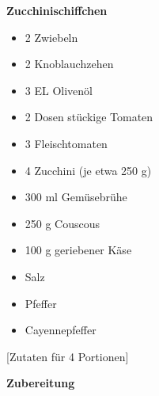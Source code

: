 

\parindent0pt	

\pagestyle{empty}


\textbf{{\LARGE Zucchinischiffchen}}%

\hrulefill
\vspace*{\fill}
\begin{multicols}{2}	


\begin{itemize}
\item 2 	Zwiebeln
\item 2 	Knoblauchzehen
\item 3	EL 	Olivenöl	
\item 2 Dosen	stückige Tomaten
\item 3 	Fleischtomaten
\item 4 	Zucchini (je etwa 250 g)
\item 300 ml	Gemüsebrühe
\item 250 g	Couscous
\item 100 g	geriebener Käse
\item Salz
\item Pfeffer
\item Cayennepfeffer
\end{itemize}
\end{multicols}
\vfill									%

\vspace{2cm}
%
\begin{center}
%
[Zutaten für 4 Portionen]%
\end{center}


\vfill
\newpage
\textbf{{\LARGE Zubereitung}}%

\hrulefill

